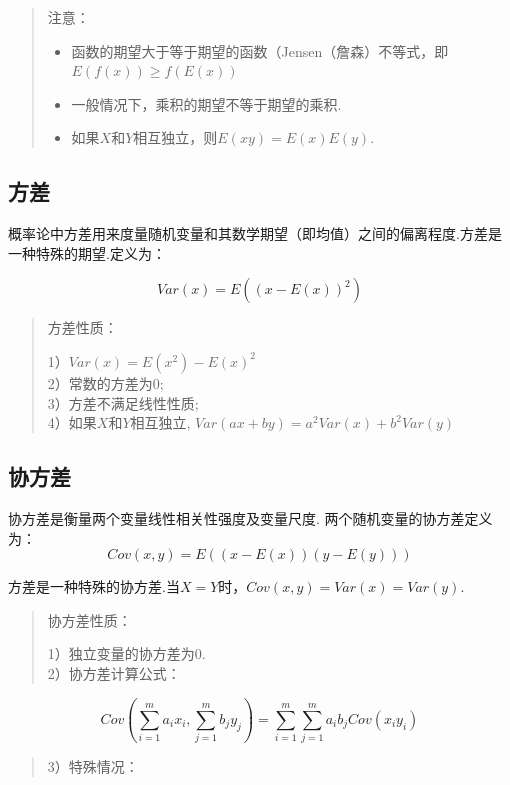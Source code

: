\begin{quote}
注意：

\begin{itemize}
 \item
  函数的期望大于等于期望的函数（Jensen（詹森）不等式，即\(E(f(x))\geqslant f(E(x))\)\\
\item
  一般情况下，乘积的期望不等于期望的乘积.\\
\item
  如果\(X\)和\(Y\)相互独立，则\(E(xy)=E(x)E(y)​\).
\end{itemize}
\end{quote}

\subsection{方差}\label{ux65b9ux5dee}

概率论中方差用来度量随机变量和其数学期望（即均值）之间的偏离程度.方差是一种特殊的期望.定义为：

\[
Var(x) = E((x-E(x))^2)
\]

\begin{quote}
方差性质：

1）\(Var(x) = E(x^2) -E(x)^2\)\\
2）常数的方差为0;\\
3）方差不满足线性性质;\\
4）如果\(X\)和\(Y\)相互独立, \(Var(ax+by)=a^2Var(x)+b^2Var(y)\)
\end{quote}

\subsection{ 协方差}\label{ux534fux65b9ux5dee}

协方差是衡量两个变量线性相关性强度及变量尺度.
两个随机变量的协方差定义为： \[
Cov(x,y)=E((x-E(x))(y-E(y)))
\]

方差是一种特殊的协方差.当\(X=Y\)时，\(Cov(x,y)=Var(x)=Var(y)\).

\begin{quote}
协方差性质：

1）独立变量的协方差为0.\\
2）协方差计算公式：
\end{quote}

\[
Cov(\sum_{i=1}^{m}{a_ix_i}, \sum_{j=1}^{m}{b_jy_j}) = \sum_{i=1}^{m} \sum_{j=1}^{m}{a_ib_jCov(x_iy_i)}
\]

\begin{quote}
3）特殊情况：
\end{quote}

